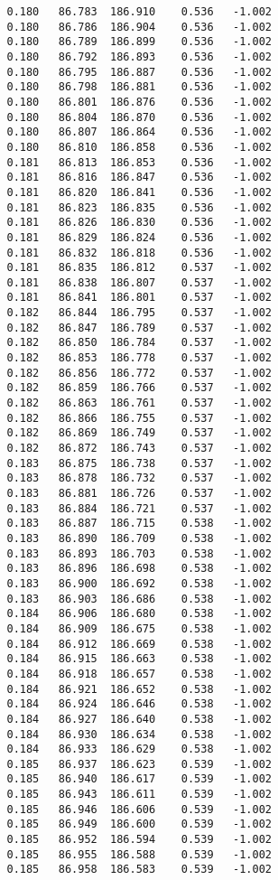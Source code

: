 \begin{verbatim}
   0.180   86.783  186.910    0.536   -1.002
   0.180   86.786  186.904    0.536   -1.002
   0.180   86.789  186.899    0.536   -1.002
   0.180   86.792  186.893    0.536   -1.002
   0.180   86.795  186.887    0.536   -1.002
   0.180   86.798  186.881    0.536   -1.002
   0.180   86.801  186.876    0.536   -1.002
   0.180   86.804  186.870    0.536   -1.002
   0.180   86.807  186.864    0.536   -1.002
   0.180   86.810  186.858    0.536   -1.002
   0.181   86.813  186.853    0.536   -1.002
   0.181   86.816  186.847    0.536   -1.002
   0.181   86.820  186.841    0.536   -1.002
   0.181   86.823  186.835    0.536   -1.002
   0.181   86.826  186.830    0.536   -1.002
   0.181   86.829  186.824    0.536   -1.002
   0.181   86.832  186.818    0.536   -1.002
   0.181   86.835  186.812    0.537   -1.002
   0.181   86.838  186.807    0.537   -1.002
   0.181   86.841  186.801    0.537   -1.002
   0.182   86.844  186.795    0.537   -1.002
   0.182   86.847  186.789    0.537   -1.002
   0.182   86.850  186.784    0.537   -1.002
   0.182   86.853  186.778    0.537   -1.002
   0.182   86.856  186.772    0.537   -1.002
   0.182   86.859  186.766    0.537   -1.002
   0.182   86.863  186.761    0.537   -1.002
   0.182   86.866  186.755    0.537   -1.002
   0.182   86.869  186.749    0.537   -1.002
   0.182   86.872  186.743    0.537   -1.002
   0.183   86.875  186.738    0.537   -1.002
   0.183   86.878  186.732    0.537   -1.002
   0.183   86.881  186.726    0.537   -1.002
   0.183   86.884  186.721    0.537   -1.002
   0.183   86.887  186.715    0.538   -1.002
   0.183   86.890  186.709    0.538   -1.002
   0.183   86.893  186.703    0.538   -1.002
   0.183   86.896  186.698    0.538   -1.002
   0.183   86.900  186.692    0.538   -1.002
   0.183   86.903  186.686    0.538   -1.002
   0.184   86.906  186.680    0.538   -1.002
   0.184   86.909  186.675    0.538   -1.002
   0.184   86.912  186.669    0.538   -1.002
   0.184   86.915  186.663    0.538   -1.002
   0.184   86.918  186.657    0.538   -1.002
   0.184   86.921  186.652    0.538   -1.002
   0.184   86.924  186.646    0.538   -1.002
   0.184   86.927  186.640    0.538   -1.002
   0.184   86.930  186.634    0.538   -1.002
   0.184   86.933  186.629    0.538   -1.002
   0.185   86.937  186.623    0.539   -1.002
   0.185   86.940  186.617    0.539   -1.002
   0.185   86.943  186.611    0.539   -1.002
   0.185   86.946  186.606    0.539   -1.002
   0.185   86.949  186.600    0.539   -1.002
   0.185   86.952  186.594    0.539   -1.002
   0.185   86.955  186.588    0.539   -1.002
   0.185   86.958  186.583    0.539   -1.002

\end{verbatim}

